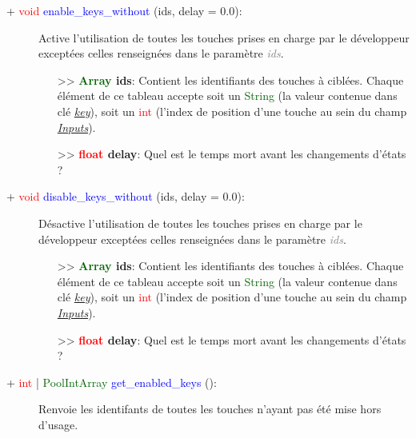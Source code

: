 \documentclass[a4paper, 11pt]{article}
\begin{document}
	\begin{description}
		\item [+ \textcolor{red}{void} \textcolor{blue}{enable\_keys\_without} (ids, delay = 0.0):] Active 
		l'utilisation de toutes les touches prises en charge par le développeur exceptées celles renseignées 
		dans le paramètre \textcolor{gray}{\textit{ids}}.
		\begin{itemize}
			\item [>> \textbf{\textcolor{darkgreen}{Array} ids}:] Contient les identifiants des touches à 
			ciblées. Chaque élément de ce tableau accepte soit un \textcolor{darkgreen}{String} (la valeur 
			contenue dans clé \textit{\hyperlink{key}{key}}), soit un \textcolor{red}{int} (l'index de 
			position d'une touche au sein du champ \textit{\hyperlink{inputs}{Inputs}}).
			\item [>> \textbf{\textcolor{red}{float} delay}:] Quel est le temps mort avant les changements
			d'états ?\\
		\end{itemize}
	\end{description}
	\begin{description}
		\item [+ \textcolor{red}{void} \textcolor{blue}{disable\_keys\_without} (ids, delay = 0.0):] 
		Désactive l'utilisation de toutes les touches prises en charge par le développeur exceptées celles 
		renseignées dans le paramètre \textcolor{gray}{\textit{ids}}.
		\begin{itemize}
			\item [>> \textbf{\textcolor{darkgreen}{Array} ids}:] Contient les identifiants des touches à 
			ciblées. Chaque élément de ce tableau accepte soit un \textcolor{darkgreen}{String} (la valeur 
			contenue dans clé \textit{\hyperlink{key}{key}}), soit un \textcolor{red}{int} (l'index de 
			position d'une touche au sein du champ \textit{\hyperlink{inputs}{Inputs}}).
			\item [>> \textbf{\textcolor{red}{float} delay}:] Quel est le temps mort avant les changements
			d'états ?\\
		\end{itemize}
	\end{description}
	\begin{description}
		\item [+ \textcolor{red}{int} | \textcolor{darkgreen}{PoolIntArray} \textcolor{blue}
		{get\_enabled\_keys} ():] Renvoie les identifants de toutes les touches n'ayant pas été mise hors 
		d'usage.\\
	\end{description}
\end{document}
